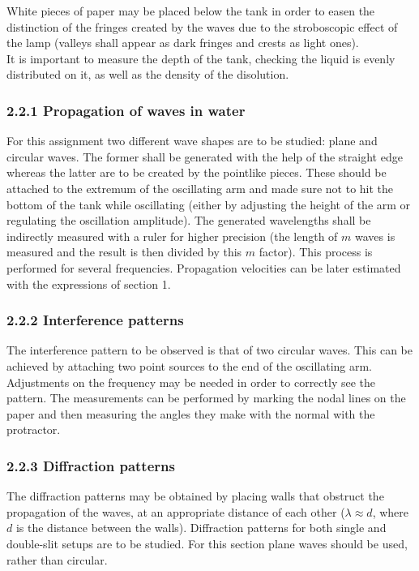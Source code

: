 \documentclass[a4paper, 12pt]{article}
\begin{document}
	White pieces of paper may be placed below the tank in order to easen the distinction of the fringes created by the waves due to the stroboscopic effect of the lamp (valleys shall appear as dark fringes and crests as light ones).\\
	
	It is important to measure the depth of the tank, checking the liquid is evenly distributed on it, as well as the density of the disolution.
	\subsubsection{2.2.1 Propagation of waves in water}
	For this assignment two different wave shapes are to be studied: plane and circular waves. The former shall be generated with the help of the straight edge whereas the latter are to be created by the pointlike pieces. These should be attached to the extremum of the oscillating arm and made sure not to hit the bottom of the tank while oscillating (either by adjusting the height of the arm or regulating the oscillation amplitude). The generated wavelengths shall be indirectly measured with a ruler for higher precision (the length of $m$ waves is measured and the result is then divided by this $m$ factor). This process is performed for several frequencies. Propagation velocities can be later estimated with the expressions of section 1. \\
	
	\subsubsection{2.2.2 Interference patterns}
 	The interference pattern to be observed is that of two circular waves. This can be achieved by attaching two point sources to the end of the oscillating arm. Adjustments on the frequency may be needed in order to correctly see the pattern. The measurements can be performed by marking the nodal lines on the paper and then measuring the angles they make with the normal with the protractor.
 	
 	\subsubsection{2.2.3 Diffraction patterns}
 	The diffraction patterns may be obtained by placing walls that obstruct the propagation of the waves, at an appropriate distance of each other ($\lambda \approx d$, where $d$ is the distance between the walls). Diffraction patterns for both single and double-slit setups are to be studied. For this section plane waves should be used, rather than circular.
\end{document}
